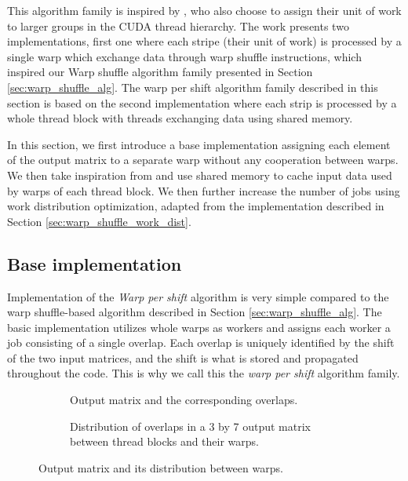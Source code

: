This algorithm family is inspired by \citet{paper:levenstein}, who also choose to assign their unit of work to larger groups in the CUDA thread hierarchy. The work presents two implementations, first one where each stripe (their unit of work) is processed by a single warp which exchange data through warp shuffle instructions, which inspired our Warp shuffle algorithm family presented in Section \ref{sec:warp_shuffle_alg}. The warp per shift algorithm family described in this section is based on the second implementation where each strip is processed by a whole thread block with threads exchanging data using shared memory. 

In this section, we first introduce a base implementation assigning each element of the output matrix to a separate warp without any cooperation between warps. We then take inspiration from \citet{paper:levenstein} and use shared memory to cache input data used by warps of each thread block. We then further increase the number of jobs using work distribution optimization, adapted from the implementation described in Section \ref{sec:warp_shuffle_work_dist}. 

\subsection{Base implementation}



Implementation of the \textit{Warp per shift} algorithm is very simple compared to the warp shuffle-based algorithm described in Section \ref{sec:warp_shuffle_alg}. The basic implementation utilizes whole warps as workers and assigns each worker a job consisting of a single overlap. Each overlap is uniquely identified by the shift of the two input matrices, and the shift is what is stored and propagated throughout the code. This is why we call this the \textit{warp per shift} algorithm family.

\begin{figure}[ht]
	\centering	
	\begin{subfigure}{0.55\textwidth}
		\fontsize{6}{8}\selectfont
		\centering
		\def\svgwidth{\textwidth}
		
		\caption{Output matrix and the corresponding overlaps.}
		\label{fig:warp_per_shift_overlaps}
	\end{subfigure}
	\hfill
	\begin{subfigure}{0.4\textwidth}
		\centering
		\def\svgwidth{\textwidth}
		\fontsize{6}{8}\selectfont
		
		\caption{Distribution of overlaps in a 3 by 7 output matrix between thread blocks and their warps.}
		\label{fig:warp_per_shift_warps}
	\end{subfigure}
	
	\caption{Output matrix and its distribution between warps.}
\end{figure}

